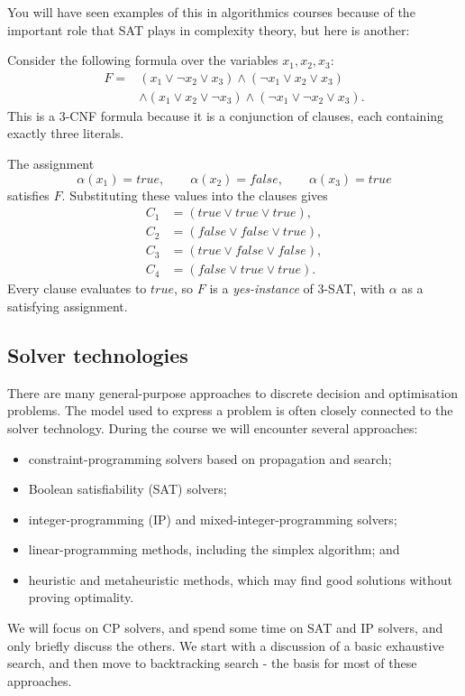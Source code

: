 \documentclass[11pt]{article}
\begin{document}
You will have seen examples of this in algorithmics courses because of the important role that SAT plays in complexity theory, but here is another:

Consider the following formula over the variables $x_1,x_2,x_3$:
\[
\begin{aligned}
F={}&(x_1\lor\neg x_2\lor x_3)
\land(\neg x_1\lor x_2\lor x_3)\\
&\land(x_1\lor x_2\lor\neg x_3)
\land(\neg x_1\lor\neg x_2\lor x_3).
\end{aligned}
\]
This is a $3$-CNF formula because it is a conjunction of clauses, each
containing exactly three literals.

The assignment
\[
    \alpha(x_1)=\mathit{true},\qquad
    \alpha(x_2)=\mathit{false},\qquad
    \alpha(x_3)=\mathit{true}
\]
satisfies $F$. Substituting these values into the clauses gives
\[
\begin{aligned}
    C_1&=(\mathit{true}\lor\mathit{true}\lor\mathit{true}),\\
    C_2&=(\mathit{false}\lor\mathit{false}\lor\mathit{true}),\\
    C_3&=(\mathit{true}\lor\mathit{false}\lor\mathit{false}),\\
    C_4&=(\mathit{false}\lor\mathit{true}\lor\mathit{true}).
\end{aligned}
\]
Every clause evaluates to $\mathit{true}$, so $F$ is a \emph{yes-instance} of
\textsc{3-SAT}, with $\alpha$ as a satisfying assignment.


\subsection{Solver technologies}

There are many general-purpose approaches to discrete decision and optimisation
problems. The model used to express a problem is often closely connected to the
solver technology. During the course we will encounter several approaches:
\begin{itemize}
    \item constraint-programming solvers based on propagation and search;
    \item Boolean satisfiability (SAT) solvers;
    \item integer-programming (IP) and mixed-integer-programming solvers;
    \item linear-programming methods, including the simplex algorithm; and
    \item heuristic and metaheuristic methods, which may find good solutions
    without proving optimality.
\end{itemize}
We will focus on CP solvers, and spend some time on SAT and IP solvers, and only briefly discuss the others.  We start with a discussion of a basic exhaustive search, and then move to backtracking search - the basis for most of these approaches.  
\end{document}
